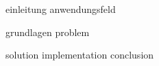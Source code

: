 \begin{comment}
Guidelines:
Seiten: 50
Präsentation: 30 min / Disskusion: 15 min
\end{comment}

{einleitung}
{anwendungsfeld}

{grundlagen}
{problem}

{solution}
{implementation}
{conclusion}

\newpage
